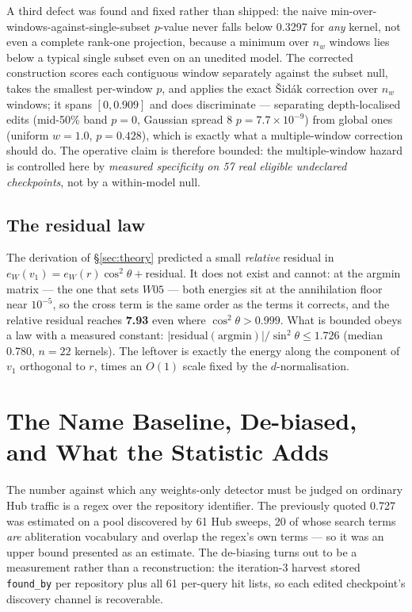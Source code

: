 \documentclass[11pt,letterpaper]{article}
\begin{document}
A third defect was found and fixed rather than shipped: the naive min-over-windows-against-single-subset $p$-value never falls below 0.3297 for \emph{any} kernel, not even a complete rank-one projection, because a minimum over $n_w$ windows lies below a typical single subset even on an unedited model. The corrected construction scores each contiguous window separately against the subset null, takes the smallest per-window $p$, and applies the exact \v{S}id\'ak correction over $n_w$ windows; it spans $[0, 0.909]$ and does discriminate --- separating depth-localised edits (mid-50\% band $p = 0$, Gaussian spread 8 $p = 7.7\times10^{-9}$) from global ones (uniform $w=1.0$, $p = 0.428$), which is exactly what a multiple-window correction should do. The operative claim is therefore bounded: the multiple-window hazard is controlled here by \emph{measured specificity on 57 real eligible undeclared checkpoints}, not by a within-model null.

\subsection{The residual law}

The derivation of \S\ref{sec:theory} predicted a small \emph{relative} residual in $e_W(v_1) = e_W(r)\cos^2\theta + \text{residual}$. It does not exist and cannot: at the argmin matrix --- the one that sets $W05$ --- both energies sit at the annihilation floor near $10^{-5}$, so the cross term is the same order as the terms it corrects, and the relative residual reaches \textbf{7.93} even where $\cos^2\theta > 0.999$. What is bounded obeys a law with a measured constant: $|\text{residual}(\text{argmin})| / \sin^2\theta \le 1.726$ (median 0.780, $n = 22$ kernels). The leftover is exactly the energy along the component of $v_1$ orthogonal to $r$, times an $O(1)$ scale fixed by the $d$-normalisation.

\section{The Name Baseline, De-biased, and What the Statistic Adds}
\label{sec:name}

The number against which any weights-only detector must be judged on ordinary Hub traffic is a regex over the repository identifier. The previously quoted 0.727 was estimated on a pool discovered by 61 Hub sweeps, 20 of whose search terms \emph{are} abliteration vocabulary and overlap the regex's own terms --- so it was an upper bound presented as an estimate. The de-biasing turns out to be a measurement rather than a reconstruction: the iteration-3 harvest stored \texttt{found\_by} per repository plus all 61 per-query hit lists, so each edited checkpoint's discovery channel is recoverable.
\end{document}
